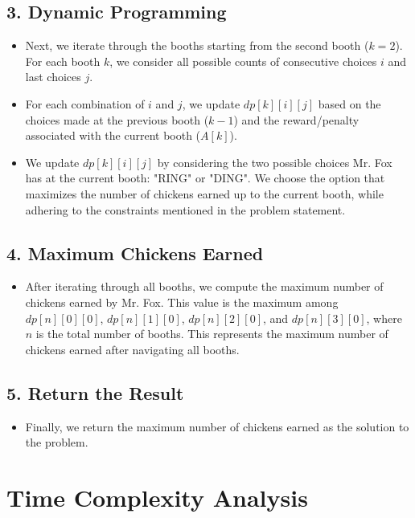 \documentclass{article}
\begin{document}
{\subsection*{3. Dynamic Programming}
\begin{itemize}
    \item Next, we iterate through the booths starting from the second booth ($k = 2$). For each booth $k$, we consider all possible counts of consecutive choices $i$ and last choices $j$.
    \item For each combination of $i$ and $j$, we update $dp[k][i][j]$ based on the choices made at the previous booth ($k-1$) and the reward/penalty associated with the current booth ($A[k]$).
    \item We update $dp[k][i][j]$ by considering the two possible choices Mr. Fox has at the current booth: "RING" or "DING". We choose the option that maximizes the number of chickens earned up to the current booth, while adhering to the constraints mentioned in the problem statement.
\end{itemize}

\subsection*{4. Maximum Chickens Earned}
\begin{itemize}
    \item After iterating through all booths, we compute the maximum number of chickens earned by Mr. Fox. This value is the maximum among $dp[n][0][0]$, $dp[n][1][0]$, $dp[n][2][0]$, and $dp[n][3][0]$, where $n$ is the total number of booths. This represents the maximum number of chickens earned after navigating all booths.
\end{itemize}

\subsection*{5. Return the Result}
\begin{itemize}
    \item Finally, we return the maximum number of chickens earned as the solution to the problem.
\end{itemize}

}

\newpage

\section*{Time Complexity Analysis}
\end{document}
